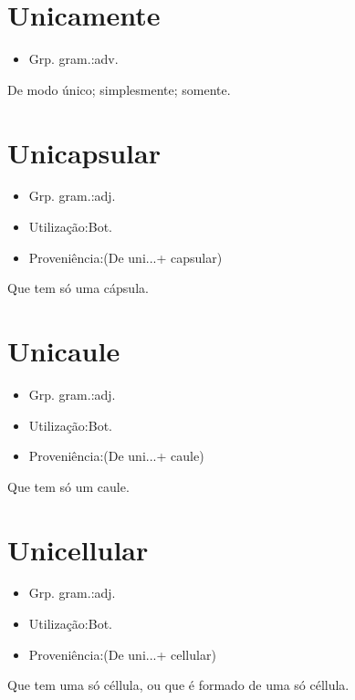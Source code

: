\documentclass{article}
\begin{document}
\section{Unicamente}
\begin{itemize}
\item {Grp. gram.:adv.}
\end{itemize}
De modo único; simplesmente; somente.
\section{Unicapsular}
\begin{itemize}
\item {Grp. gram.:adj.}
\end{itemize}
\begin{itemize}
\item {Utilização:Bot.}
\end{itemize}
\begin{itemize}
\item {Proveniência:(De \textunderscore uni...\textunderscore  + \textunderscore capsular\textunderscore )}
\end{itemize}
Que tem só uma cápsula.
\section{Unicaule}
\begin{itemize}
\item {Grp. gram.:adj.}
\end{itemize}
\begin{itemize}
\item {Utilização:Bot.}
\end{itemize}
\begin{itemize}
\item {Proveniência:(De \textunderscore uni...\textunderscore  + \textunderscore caule\textunderscore )}
\end{itemize}
Que tem só um caule.
\section{Unicellular}
\begin{itemize}
\item {Grp. gram.:adj.}
\end{itemize}
\begin{itemize}
\item {Utilização:Bot.}
\end{itemize}
\begin{itemize}
\item {Proveniência:(De \textunderscore uni...\textunderscore  + \textunderscore cellular\textunderscore )}
\end{itemize}
Que tem uma só céllula, ou que é formado de uma só céllula.
\end{document}
